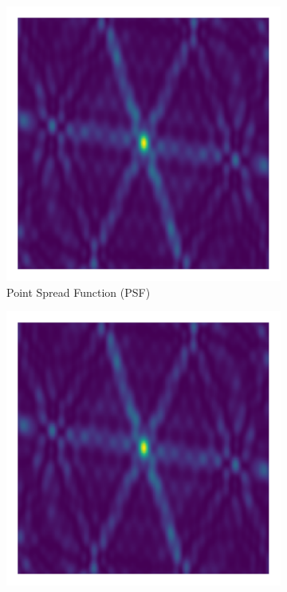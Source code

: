 \begin{figure}[h!]
	\centering
	\begin{subfigure}[b]{0.3\linewidth}
		\includegraphics[width=\linewidth, trim={18px 19px 18px 18px}, clip]{./chapters/01.intro/img/psf.png}
		\caption{Point Spread Function (PSF)}
	\end{subfigure}
	\begin{subfigure}[b]{0.3\linewidth}
		\includegraphics[width=\linewidth, trim={18px 19px 18px 18px}, clip]{./chapters/01.intro/img/psf.png}

\end{subfigure}
\end{figure}
